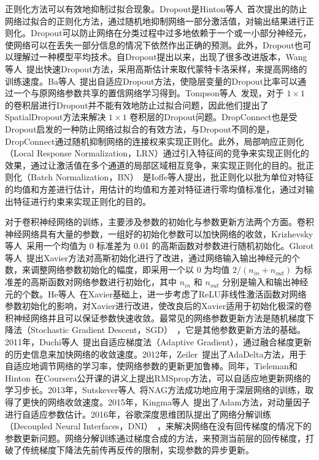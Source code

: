 正则化方法可以有效地抑制过拟合现象。Dropout是Hinton等人~\cite{hinton2012improving}首次提出的防止网络过拟合的正则化方法，通过随机地抑制网络一部分激活值，对输出结果进行正则化。Dropout可以防止网络在分类过程中过多地依赖于一个或一小部分神经元，使网络可以在丢失一部分信息的情况下依然作出正确的预测。此外，Dropout也可以理解过一种模型平均技术。自Dropout提出以来，出现了很多改进版本，Wang等人~\cite{wang2013fast}提出快速Dropout方法，采用高斯估计来取代蒙特卡洛采样，来提高网络的训练速度。Ba等人~\cite{ba2013adaptive}提出自适应Dropout方法，使隐层变量的Dropout比率可以通过一个与原网络参数共享的置信网络学习得到。Tompson等人~\cite{tompson2015efficient}发现，对于 $1{\times}1$ 的卷积层进行Dropout并不能有效地防止过拟合问题，因此他们提出了SpatialDropout方法来解决 $1{\times}1$ 卷积层的Dropout问题。DropConnect也是受Dropout启发的一种防止网络过拟合的有效方法，与Dropout不同的是，DropConnect通过随机抑制网络的连接权来实现正则化。此外，局部响应正则化（Local Response Normalization，LRN）通过引入特征间的竞争来实现正则化的效果，通过让激活值在多个通道的局部区域相互竞争，来实现正则化的目的。批正则化（Batch Normalization，BN）~\cite{ioffe2015batch}是Ioffe等人提出，批正则化以批为单位对特征的均值和方差进行估计，用估计的均值和方差对特征进行零均值标准化，通过对输出特征进行约束来实现正则化的目的。


对于卷积神经网络的训练，主要涉及参数的初始化与参数更新方法两个方面。卷积神经网络具有大量的参数，一组好的初始化参数可以加快网络的收敛，Krizhevsky等人~\cite{krizhevsky2012imagenet}采用一个均值为 0 标准差为 0.01 的高斯函数对参数进行随机初始化。Glorot等人~\cite{glorot2010understanding}提出Xavier方法对高斯初始化进行了改进，通过网络输入输出神经元的个数，来调整网络参数初始化的幅度，即采用一个以 0 为均值 $2/(n_{in}+n_{out})$ 为标准差的高斯函数对网络参数进行初始化，其中 $n_{in}$ 和 $n_{out}$ 分别是输入和输出神经元的个数。He等人~\cite{he2015delving}在Xavier基础上，进一步考虑了ReLU非线性激活函数对网络参数初始化的影响，对Xavier进行改进，使改良后的Xavier适用于初始化极深的卷积神经网络并且可以保证参数快速收敛。最常见的网络参数更新方法是随机梯度下降法（Stochastic Gradient Descent，SGD）~\cite{bottou2012stochastic}，它是其他参数更新方法的基础。2011年，Duchi等人~\cite{duchi2011adaptive}提出自适应梯度法（Adaptive Gradient），通过融合梯度更新的历史信息来加快网络的收敛速度。2012年，Zeiler~\cite{zeiler2012adadelta}提出了AdaDelta方法，用于自适应地调节网络的学习率，使网络参数的更新更加鲁棒。同年，Tieleman和Hinton~\cite{tieleman2012}在Coursera公开课的讲义上提出RMSprop方法，可以自适应地更新网络的学习步长。2013年，Sutskever等人~\cite{sutskever2013importance}将NAG方法成功地应用于深层网络的训练，取得了更快的网络收敛速度。2015年，Kingma等人~\cite{kingma2014adam}提出了Adam方法，对动量因子进行自适应参数估计。2016年，谷歌深度思维团队提出了网络分解训练（Decoupled Neural Interfaces，DNI）~\cite{jaderberg2016decoupled}，来解决网络在没有回传梯度的情况下的参数更新问题。网络分解训练通过梯度合成的方法，来预测当前层的回传梯度，打破了传统梯度下降法先前传再反传的限制，实现参数的异步更新。


